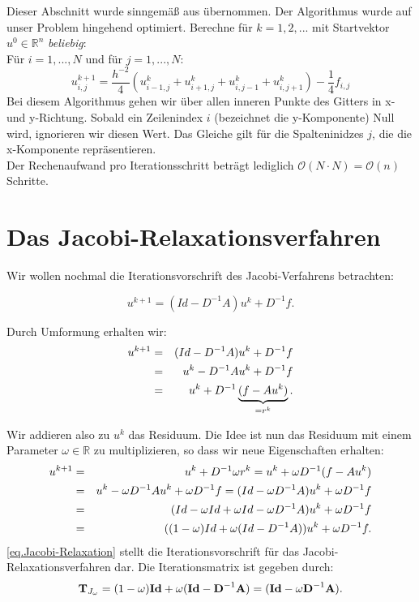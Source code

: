 Dieser Abschnitt wurde sinngemäß aus \cite{ALO2} übernommen. Der Algorithmus wurde auf unser Problem hingehend optimiert.
Berechne für $k = 1,2,...$ mit Startvektor $u^{0} \in \mathbb{R}^{n}$ \textit{beliebig}:\\
Für $i = 1,...,N$ und für $j = 1,...,N$:
\begin{equation}
u^{k+1}_{i,j} = \frac{h^{-2}}{4} (u^{k}_{i-1,j} + u^{k}_{i+1,j} + u^{k}_{i,j-1} + u^{k}_{i,j+1}) - \frac{1}{4} f_{i,j}
\end{equation}
Bei diesem Algorithmus gehen wir über allen inneren Punkte des Gitters in x- und y-Richtung. Sobald ein Zeilenindex $i$ (bezeichnet die y-Komponente) Null wird, ignorieren wir diesen Wert. Das Gleiche gilt für die Spalteninidzes $j$, die die x-Komponente repräsentieren.\\
Der Rechenaufwand pro Iterationsschritt beträgt lediglich $\mathcal{O}(N \cdot N)=\mathcal{O}(n)$ Schritte.

\section{Das Jacobi-Relaxationsverfahren}\label{s.Jacobi Relaxation}

Wir wollen nochmal die Iterationsvorschrift des Jacobi-Verfahrens betrachten:

\begin{equation}
u^{k+1} = (Id - D^{-1}A)u^{k} + D^{-1}f.
\end{equation}

Durch Umformung erhalten wir:
\begin{eqnarray}
u^{k+1} &=& (Id - D^{-1}A)u^{k} + D^{-1}f \notag \\
&=& u^{k} - D^{-1}Au^{k} + D^{-1}f \notag \\
&=& u^{k} + D^{-1} \underbrace{(f - Au^{k})}_{= r^{k}}.
\end{eqnarray}

Wir addieren also zu $u^{k}$ das Residuum. Die Idee ist nun das Residuum mit einem Parameter $\omega \in \mathbb{R}$ zu multiplizieren, so dass wir neue Eigenschaften erhalten:
\begin{eqnarray}
u^{k+1} &=& u^{k} + D^{-1} \omega r^{k} = u^{k} + \omega D^{-1} (f - Au^{k}) \notag \\
&=& u^{k} - \omega D^{-1} Au^{k} + \omega D^{-1}f = (Id - \omega D^{-1} A)u^{k} + \omega D^{-1}f \notag \\
&=& (Id - \omega Id + \omega Id - \omega D^{-1} A)u^{k} + \omega D^{-1}f \notag \\
&=& ((1 - \omega)Id + \omega(Id - D^{-1}A)) u^{k} + \omega D^{-1}f.\label{eq.Jacobi-Relaxation}
\end{eqnarray}
\autoref{eq.Jacobi-Relaxation} stellt die Iterationsvorschrift für das Jacobi-Relaxationsverfahren dar. Die Iterationsmatrix ist gegeben durch:
\begin{equation}
{\textbf{T}}_{J_{\omega}} = (1 - \omega) {\textbf{Id}} + \omega({\textbf{Id}} - {\textbf{D}}^{-1} {\textbf{A}}) = ({\textbf{Id}} - \omega {\textbf{D}}^{-1} {\textbf{A}}).
\end{equation}

